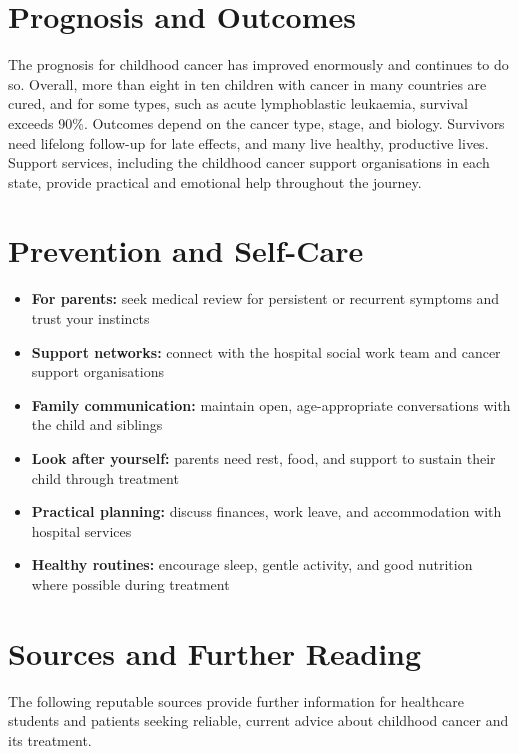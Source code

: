 \section*{Prognosis and Outcomes}
The prognosis for childhood cancer has improved enormously and continues to do so. Overall, more than eight in ten children with cancer in many countries are cured, and for some types, such as acute lymphoblastic leukaemia, survival exceeds 90\%. Outcomes depend on the cancer type, stage, and biology. Survivors need lifelong follow-up for late effects, and many live healthy, productive lives. Support services, including the childhood cancer support organisations in each state, provide practical and emotional help throughout the journey.

\section*{Prevention and Self-Care}
\begin{itemize}
    \item \textbf{For parents:} seek medical review for persistent or recurrent symptoms and trust your instincts
    \item \textbf{Support networks:} connect with the hospital social work team and cancer support organisations
    \item \textbf{Family communication:} maintain open, age-appropriate conversations with the child and siblings
    \item \textbf{Look after yourself:} parents need rest, food, and support to sustain their child through treatment
    \item \textbf{Practical planning:} discuss finances, work leave, and accommodation with hospital services
    \item \textbf{Healthy routines:} encourage sleep, gentle activity, and good nutrition where possible during treatment
\end{itemize}

\section*{Sources and Further Reading}
The following reputable sources provide further information for healthcare students and patients seeking reliable, current advice about childhood cancer and its treatment.

